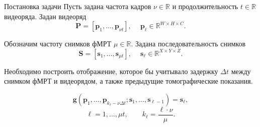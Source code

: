 \documentclass[10pt]{beamer}
\begin{document}
\begin{frame}{Постановка задачи}
    Пусть задана частота кадров $\nu \in \mathbb{R}$ и продолжительность $t \in \mathbb{R}$ видеоряда. 
	Задан видеоряд
	\begin{equation*}
		\label{eq1}
		\mathbf{P} = [\mathbf{p}_1, \ldots, \mathbf{p}_{\nu t}], \quad\
		\mathbf{p}_{\ell} \in \mathbb{R}^{W \times H \times C}.
	\end{equation*}

	Обозначим частоту снимков фМРТ $\mu \in \mathbb{R}$. Задана последовательность снимков 
	\begin{equation*}
		\label{eq2}
		\mathbf{S} = [\mathbf{s}_1, \ldots, \mathbf{s}_{\mu t}], \quad\
		\mathbf{s}_{\ell} \in \mathbb{R}^{X \times Y \times Z}.
	\end{equation*}

	Необходимо построить отображение, которое бы учитывало задержку $\Delta t$ между
	снимком фМРТ и видеорядом, а также предыдущие томографические показания.
    \begin{block}{}
        \begin{equation*}
            \label{eq3}
            \mathbf{g}(\mathbf{p}_1, \ldots, \mathbf{p}_{k_{\ell} - \nu \Delta t}; \mathbf{s}_1, \ldots, \mathbf{s}_{\ell-1}) = \mathbf{s}_{\ell},
        \end{equation*}
        \begin{equation*}
            \ell = 1, \ldots, \mu t, \qquad k_{\ell} = \dfrac{\ell \cdot \nu}{\mu}.
        \end{equation*}
    \end{block}
\end{frame}
\end{document}
